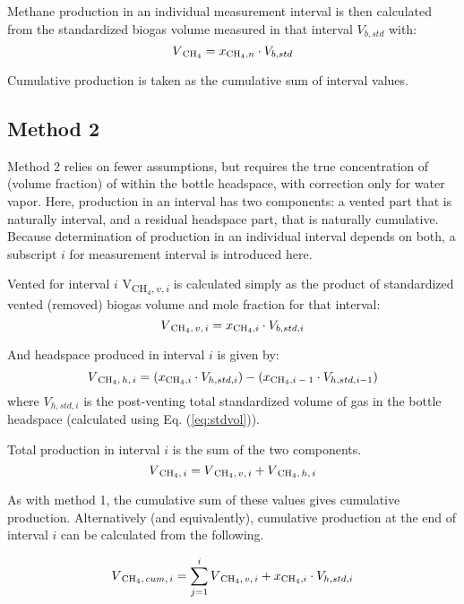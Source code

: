 \documentclass[]{article}
\begin{document}
Methane production in an individual measurement interval is then calculated from the standardized biogas volume measured in that interval $V_{b,std}$ with:
\begin{equation}
  V\textsubscript{CH$_4$} = x\textsubscript{CH$_4$,$ n$} \cdot V_{b, std}
\end{equation}

Cumulative  production is taken as the cumulative sum of interval values.

\subsection{Method 2}
Method 2 relies on fewer assumptions, but requires the true concentration of  (volume fraction) of  within the bottle headspace, with correction only for water vapor.
Here,  production in an interval has two components: a vented part that is naturally interval, and a residual headspace part, that is naturally cumulative.
Because determination of  production in an individual interval depends on both, a subscript $i$ for measurement interval is introduced here.

Vented  for interval $i$ V\textsubscript{CH$_4, v, i$} is calculated simply as the product of standardized vented (removed) biogas volume and  mole fraction for that interval:
\begin{equation}
  V\textsubscript{CH$_4$$,v, i$} = x\textsubscript{CH$_4$,$ i$} \cdot V_{b, std, i}
\end{equation}

And headspace  produced in interval $i$ is given by:
\begin{equation}
  V\textsubscript{CH$_4$$, h, i$} = (x\textsubscript{CH$_4$,$ i$} \cdot V_{h, std, i}) - (x\textsubscript{CH$_4$,$ i-1$} \cdot V_{h, std, i-1})
\end{equation}
where $V_{h, std, i}$ is the post-venting total standardized volume of gas in the bottle headspace (calculated using Eq. (\ref{eq:stdvol})).

Total production in interval $i$ is the sum of the two components.
\begin{equation}
  V\textsubscript{CH$_4$$, i$} = V\textsubscript{CH$_4$$, v, i$} + V\textsubscript{CH$_4$$, h, i$}
\end{equation}

As with method 1, the cumulative sum of these values gives cumulative  production.
Alternatively (and equivalently), cumulative  production at the end of interval $i$ can be calculated from the following.

\begin{equation}
  V\textsubscript{CH$_4$$, cum, i$} = \sum_{j = 1}^i {V\textsubscript{CH$_4$$, v, i$}} +  x\textsubscript{CH$_4$,$ i$} \cdot V_{h, std, i}
\end{equation}


\end{document}
